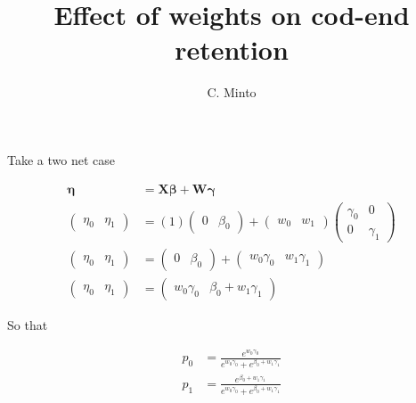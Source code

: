 \documentclass[a4paper,10pt]{article}
\title{Effect of weights on cod-end retention}
\author{C. Minto}
\begin{document}
\maketitle

Take a two net case

\begin{align}
\boldsymbol{\eta} &= \boldsymbol{X \beta} + \boldsymbol{W \gamma}\\
\begin{pmatrix}\eta_0 & \eta_1 \end{pmatrix} &= (1) \begin{pmatrix}0 & \beta_0 \end{pmatrix} + \begin{pmatrix} w_0 & w_1 \end{pmatrix} \begin{pmatrix}\gamma_0 & 0 \\ 0 & \gamma_1 \end{pmatrix} \\
\begin{pmatrix}\eta_0 & \eta_1 \end{pmatrix} &= \begin{pmatrix}0 & \beta_0 \end{pmatrix} + \begin{pmatrix} w_0 \gamma_0 & w_1 \gamma_1 \end{pmatrix} \\
\begin{pmatrix}\eta_0 & \eta_1 \end{pmatrix} &= \begin{pmatrix} w_0 \gamma_0 & \beta_0 + w_1 \gamma_1\end{pmatrix}
\end{align}

So that

\begin{align}
 p_0 &= \frac{e^{w_0 \gamma_0}}{e^{w_0 \gamma_0} + e^{\beta_0 + w_1 \gamma_1}} \\
 p_1 &= \frac{e^{\beta_0 + w_1 \gamma_1}}{e^{w_0 \gamma_0} + e^{\beta_0 + w_1 \gamma_1}}
\end{align}
\end{document}
